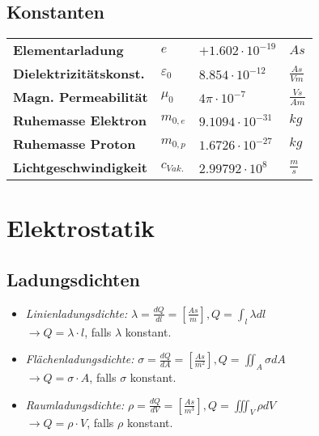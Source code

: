 \documentclass[a4paper, 11pt]{scrartcl}
\begin{document}
\begin{multicols*}{2}
				\subsection{Konstanten}				
\begin{center}				
				\begin{tabular}{llll}
				
					\textbf{Elementarladung} &$e  $&$ +1.602\cdot 10^{-19}$&$As$\\
					\textbf{Dielektrizitätskonst.}& $\varepsilon_0  $&$ 8.854\cdot 10^{-12}$&$\frac{As}{Vm}$\\
					\textbf{Magn. Permeabilität}& $\mu_0  $&$ 4\pi\cdot 10^{-7}$&$\frac{Vs}{Am}$\\
					\textbf{Ruhemasse Elektron}& $m_{0,e}  $&$ 9.1094\cdot 10^{-31}$&$kg$\\
					\textbf{Ruhemasse Proton} &$m_{0,p}  $&$ 1.6726\cdot 10^{-27}$&$kg$\\
					\textbf{Lichtgeschwindigkeit} &$c_{Vak.}  $&$ 2.99792\cdot 10^8$&$\frac{m}{s}$\\
				\end{tabular}
				\begin{small}
				\vfill
		
				\end{small}

				\end{center}	
						\section{Elektrostatik}
				
				
				\singlespacing 				
				\subsection{Ladungsdichten}
				\begin{itemize}
					\item \textit{Linienladungsdichte:} $\lambda=\frac{dQ}{dl}=\left[\frac{As}{m}\right], Q=\int_l\lambda dl$ \\
					$\rightarrow Q = \lambda \cdot l $, falls $\lambda$ konstant. 
					\item \textit{Flächenladungsdichte:} $\sigma=\frac{dQ}{dA}=\left[\frac{As}{m^2}\right], Q=\iint_A\sigma dA$ \\
					$\rightarrow Q = \sigma \cdot A$, falls $\sigma$ konstant.
					\item \textit{Raumladungsdichte:} $\rho=\frac{dQ}{dV}=\left[\frac{As}{m^3}\right],Q=\iiint_V\rho dV$  \\
					$\rightarrow Q = \rho \cdot V$, falls $\rho$ konstant.
				\end{itemize}
				

\end{multicols*}
\end{document}
